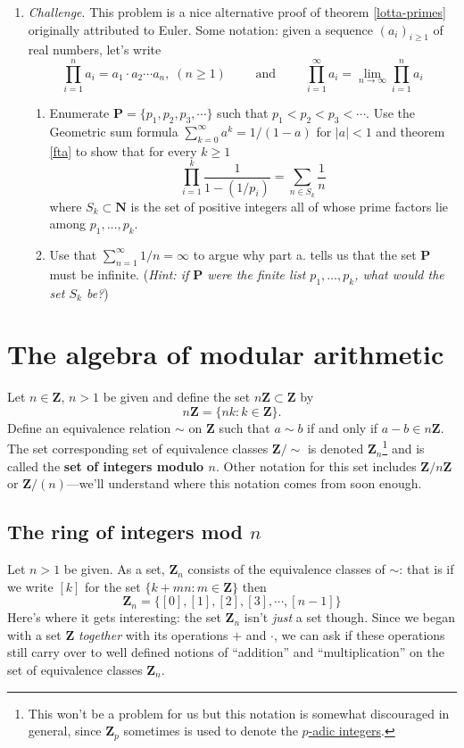 \documentclass[12pt]{article}
\numberwithin{equation}{subsection}
\theoremstyle{note}
\begin{document}
\begin{enumerate}[label=\arabic*.]
	\item \textit{Challenge}. This problem is a nice alternative proof of theorem \ref{lotta-primes} originally attributed to Euler. Some notation: given a sequence $(a_i)_{i\geq 1}$ of real numbers, let's write \[ \prod_{i=1}^n a_i = a_1\cdot a_2 \cdots a_n, \; (n\geq 1) \qquad \text{ and } \qquad \prod_{i=1}^{\infty} a_i = \lim_{n\to \infty} \prod_{i=1}^n a_i \]
	\begin{enumerate}
		\item Enumerate $\mathbf{P}=\{p_1,p_2,p_3,\cdots\}$ such that $p_1< p_2< p_3 < \cdots $. Use the Geometric sum formula $\sum_{k=0}^{\infty} a^k = 1/(1-a)$ for $|a|<1$ and theorem \ref{fta} to show that for every $k\geq 1$ \[ \prod_{i=1}^{k} \dfrac{1}{1-(1/p_i)} =\sum_{n\in S_k} \dfrac{1}{n} \] where $S_k\subset\mathbf{N}$ is the set of positive integers all of whose prime factors lie among $p_1,\dots,p_k$.
		\item Use that $\sum_{n=1}^{\infty} 1/n=\infty$ to argue why part a. tells us that the set $\mathbf{P}$ must be infinite. (\textit{Hint: if $\mathbf{P}$ were the finite list $p_1,\dots,p_k$, what would the set $S_k$ be?})	
	\end{enumerate}
	
\end{enumerate}


\section{The algebra of modular arithmetic}

Let $n\in\mathbf{Z}$, $n>1$ be given and define the set $n\mathbf{Z}\subset \mathbf{Z}$ by \begin{equation} \label{nZ} n\mathbf{Z}=\{nk : k\in\mathbf{Z}\}. \end{equation} Define an equivalence relation $\sim$ on $\mathbf{Z}$ such that $a\sim b$ if and only if $a-b\in n\mathbf{Z}$. The set corresponding set of equivalence classes $\mathbf{Z}/\sim$ is denoted $\mathbf{Z}_n$\footnote{This won't be a problem for us but this notation is somewhat discouraged in general, since $\mathbf{Z}_p$ sometimes is used to denote the \href{https://en.wikipedia.org/wiki/P-adic_number}{$p$-adic integers}.} and is called the \textbf{set of integers modulo $n$}. Other notation for this set includes $\mathbf{Z}/n\mathbf{Z}$ or $\mathbf{Z}/(n)$---we'll understand where this notation comes from soon enough. 


\subsection{The ring of integers mod $n$}
	Let $n>1$ be given.  As a set, $\mathbf{Z}_n$ consists of the equivalence classes of $\sim$: that is if we write $[k]$ for the set $\{k+mn : m\in\mathbf{Z}\}$ then \[ \mathbf{Z}_n=\{[0],[1],[2],[3],\cdots,[n-1]\}\] Here's where it gets interesting: the set $\mathbf{Z}_n$ isn't \textit{just} a set though. Since we began with a set $\mathbf{Z}$ \textit{together} with its operations $+$ and $\cdot$, we can ask if these operations still carry over to well defined notions of ``addition'' and ``multiplication'' on the set of equivalence classes $\mathbf{Z}_n$. 
	
\end{document}
